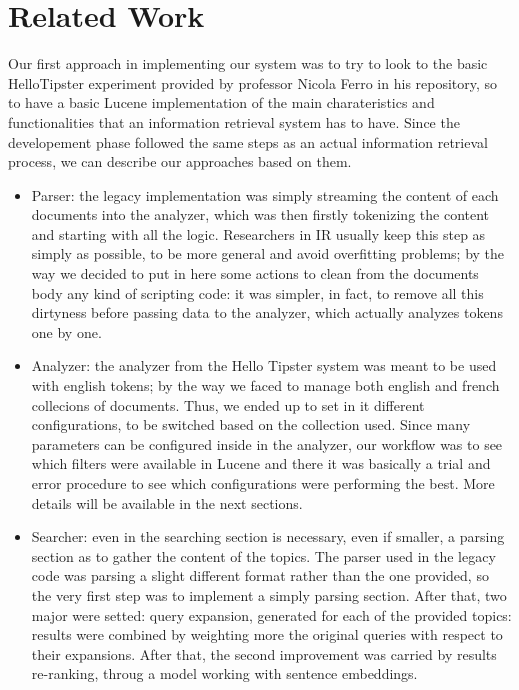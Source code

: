 \section{Related Work}
\label{sec:related}

Our first approach in implementing our system was to try to look to the basic HelloTipster 
experiment provided by professor Nicola Ferro in his repository, so to have a basic Lucene implementation
of the main charateristics and functionalities that an information retrieval system has to have.
Since the developement phase followed the same steps as an actual information retrieval process,
we can describe our approaches based on them.

\begin{itemize}
    \item Parser: the legacy implementation was simply streaming the content of each documents into the analyzer, which was then firstly tokenizing the content and starting with all the logic. Researchers in IR usually keep this step as simply as possible, to be more general and avoid overfitting problems; by the way we decided to put in here some actions to clean from the documents body any kind of scripting code: it was simpler, in fact, to remove all this dirtyness before passing data to the analyzer, which actually analyzes tokens one by one.
    \item Analyzer: the analyzer from the Hello Tipster system was meant to be used with english tokens; by the way we faced to manage both english and french collecions of documents. Thus, we ended up to set in it different configurations, to be switched based on the collection used. Since many parameters can be configured inside in the analyzer, our workflow was to see which filters were available in Lucene and there it was basically a trial and error procedure to see which configurations were performing the best. More details will be available in the next sections.
    \item Searcher: even in the searching section is necessary, even if smaller, a parsing section as to gather the content of the topics. The parser used in the legacy code was parsing a slight different format rather than the one provided, so the very first step was to implement a simply parsing section. After that, two major were setted: query expansion, generated for each of the provided topics: results were combined by weighting more the original queries with respect to their expansions. After that, the second improvement was carried by results re-ranking, throug a model working with sentence embeddings.
\end{itemize}

\pagebreak